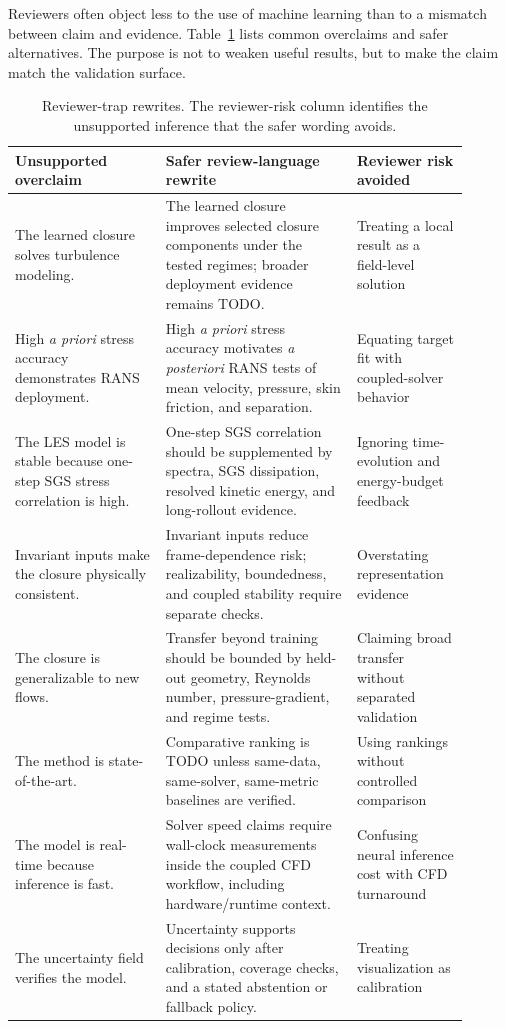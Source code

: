 \documentclass[11pt]{article}
\newcommand{\apriori}{\textit{a priori}}
\newcommand{\aposteriori}{\textit{a posteriori}}
\begin{document}
Reviewers often object less to the use of machine learning than to a mismatch between claim and evidence. Table~\ref{tab:traps} lists common overclaims and safer alternatives. The purpose is not to weaken useful results, but to make the claim match the validation surface.

\begin{table}[t]
\centering
\small
\caption{Reviewer-trap rewrites. The reviewer-risk column identifies the unsupported inference that the safer wording avoids.}
\label{tab:traps}
\begin{tabular}{p{0.30\linewidth}p{0.38\linewidth}p{0.22\linewidth}}
\toprule
Unsupported overclaim & Safer review-language rewrite & Reviewer risk avoided \\
\midrule
The learned closure solves turbulence modeling. & The learned closure improves selected closure components under the tested regimes; broader deployment evidence remains TODO. & Treating a local result as a field-level solution \\
High \apriori{} stress accuracy demonstrates RANS deployment. & High \apriori{} stress accuracy motivates \aposteriori{} RANS tests of mean velocity, pressure, skin friction, and separation. & Equating target fit with coupled-solver behavior \\
The LES model is stable because one-step SGS stress correlation is high. & One-step SGS correlation should be supplemented by spectra, SGS dissipation, resolved kinetic energy, and long-rollout evidence. & Ignoring time-evolution and energy-budget feedback \\
Invariant inputs make the closure physically consistent. & Invariant inputs reduce frame-dependence risk; realizability, boundedness, and coupled stability require separate checks. & Overstating representation evidence \\
The closure is generalizable to new flows. & Transfer beyond training should be bounded by held-out geometry, Reynolds number, pressure-gradient, and regime tests. & Claiming broad transfer without separated validation \\
The method is state-of-the-art. & Comparative ranking is TODO unless same-data, same-solver, same-metric baselines are verified. & Using rankings without controlled comparison \\
The model is real-time because inference is fast. & Solver speed claims require wall-clock measurements inside the coupled CFD workflow, including hardware/runtime context. & Confusing neural inference cost with CFD turnaround \\
The uncertainty field verifies the model. & Uncertainty supports decisions only after calibration, coverage checks, and a stated abstention or fallback policy. & Treating visualization as calibration \\
\bottomrule
\end{tabular}
\end{table}
\end{document}
